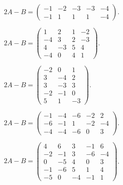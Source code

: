 \documentclass[12pt]{article}
\theoremstyle{remark}
\begin{document}
\begin{description}[style=nextline,leftmargin=3em,itemsep=0.45em]
\item[E80.] $2A-B=\begin{pmatrix}-1&-2&-3&-3&-4\\-1&1&1&1&-4\end{pmatrix}$.
\item[E81.] $2A-B=\begin{pmatrix}1&2&1&-2\\-4&3&2&-3\\4&-3&5&4\\-4&0&4&1\end{pmatrix}$.
\item[E82.] $2A-B=\begin{pmatrix}-2&0&1\\3&-4&2\\3&-3&3\\-2&-1&0\\5&1&-3\end{pmatrix}$.
\item[E83.] $2A-B=\begin{pmatrix}-1&-4&-6&-2&2\\-6&-1&1&-2&-4\\-4&-4&-6&0&3\end{pmatrix}$.
\item[E84.] $2A-B=\begin{pmatrix}4&6&3&-1&6\\-2&-1&3&-6&-4\\0&-5&4&0&3\\-1&-6&5&1&4\\-5&0&-4&-1&1\end{pmatrix}$.
\end{description}
\end{document}
